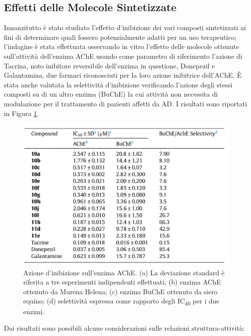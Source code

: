 \documentclass[a4paper, 12pt]{article}
\begin{document}
\subsection{Effetti delle Molecole Sintetizzate}
Innanzitutto è stato studiato l'effetto d'inibizione dei vari composti sintetizzati ai fini di determinare quali fossero potenzialmente adatti per un uso terapeutico; l'indagine è stata effettuata osservando in vitro l'effetto delle molecole ottenute sull'attività dell'enzima AChE usando come parametro di riferimento l'azione di Tacrina, noto inibitore reversibile dell'enzima in questione, Donepezil e Galantamina, due farmaci riconosciuti per la loro azione inibitrice dell'AChE. È stata anche valutata la selettività d'inibizione verificando l'azione degli stessi composti su di un altro enzima (BuChE) la cui attività non necessita di modulazione per il trattamento di pazienti affetti da AD. I risultati sono riportati in Figura \ref{fig:tabellacomposti_curcdone}.

\begin{figure}[H]
	\centering
	\includegraphics[width=.8\linewidth]{immagini/tabellacomposti_curcdone.png}
	\caption{Azione d'inibizione sull'enzima AChE. (a) La deviazione standard è riferita a tre esperimenti indipendenti effettuati; (b) enzima AChE ottenuto da Murena Helena; (c) enzima BuChE ottenuto da siero equino; (d) selettività espressa come rapporto degli IC\textsubscript{40} per i due enzimi.}
	\label{fig:tabellacomposti_curcdone}
\end{figure}

Dai risultati sono possibili alcune considerazioni sulle relazioni struttura-attività:
\end{document}
